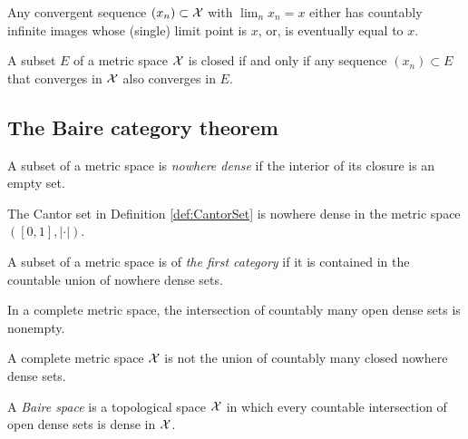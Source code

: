 \begin{lem}
  \label{lem:converge2cases}
  Any convergent sequence $(x_n)\subset{\cal X}$ with $\lim_n x_n =x$
  either has countably infinite images whose (single) limit point is
  $x$, 
  or, is eventually equal to $x$.
\end{lem}


\begin{lem}
  \label{lem:closedSetConvergence}
  A subset $E$ of a metric space ${\cal X}$ is closed
  if and only if any sequence $(x_n)\subset E$
  that converges in ${\cal X}$ also converges in $E$.
\end{lem}

\subsection{The Baire category theorem}

\begin{defn}
  \label{def:nowhereDense}
  A subset of a metric space is \emph{nowhere dense}
  if the interior of its closure is an empty set.
\end{defn}


\begin{exm}
  The Cantor set in Definition \ref{def:CantorSet}
  is nowhere dense in the metric space $([0,1],|\cdot|)$.
\end{exm}

\begin{defn}
  \label{def:metricSpaceFirstCat}
  A subset of a metric space is of \emph{the first category}
  if it is contained in the countable union of nowhere dense sets.
\end{defn}

\begin{thm}
  \label{thm:BaireCat}
  In a complete metric space,
  the intersection of countably many open dense sets is nonempty.
\end{thm}

\begin{coro}
  \label{coro:BaireCat}
  A complete metric space ${\cal X}$ is 
  not the union of countably many closed nowhere dense sets.
\end{coro}

\begin{defn}
  A \emph{Baire space} is a topological space ${\cal X}$
  in which every countable intersection of open dense sets
  is dense in ${\cal X}$.
\end{defn}



